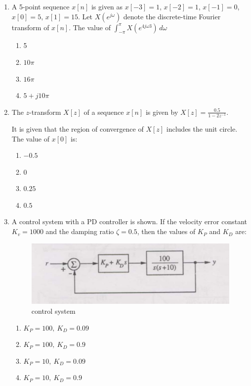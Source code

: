 \documentclass[journal,12pt,onecolumn]{IEEEtran}
\theoremstyle{remark}
\begin{document}
\begin{enumerate}
\item
A 5-point sequence $x[n]$ is given as $x[-3]=1$, $x[-2]=1$, $x[-1]=0$,\\
$x[0]=5$, $x[1]=15$. Let $X\left(e^{j\omega}\right)$ denote the discrete-time Fourier\\
transform of $x[n]$. The value of
$
\int_{-\pi}^{\pi} X\left(e^{4j\omega3}\right)\, d\omega
$
\hfill{}
\begin{multicols}{4}
\begin{enumerate}
  \item 5
  \item $10\pi$
  \item $16\pi$
  \item $5 + j10\pi$
\end{enumerate}
\end{multicols}

\item The $z$-transform $X[z]$ of a sequence $x[n]$ is given by
$
X[z]=\frac{0.5}{1-2z^{-1}}.
$

It is given that the region of convergence of $X[z]$ includes the unit circle. The value of $x[0]$ is: 
\hfill{}
\begin{multicols}{4}
\begin{enumerate}
    \item $-0.5$
    \item $0$
    \item $0.25$
    \item $0.5$
\end{enumerate}
\end{multicols}

\item A control system with a PD controller is shown. If the velocity error constant $K_v=1000$ and the damping ratio $\zeta=0.5$, then the values of $K_P$ and $K_D$ are: 

\begin{figure}[H]
    \centering
    \includegraphics[width=0.5\linewidth]{Q52.jpg}
    \caption{control system}
    \label{fig:full_wave}
\end{figure}
\hfill{}
\begin{enumerate}
    \item $K_P=100,\ K_D=0.09$
    \item $K_P=100,\ K_D=0.9$
    \item $K_P=10,\ K_D=0.09$
    \item $K_P=10,\ K_D=0.9$
\end{enumerate}



\end{enumerate}
\end{document}
